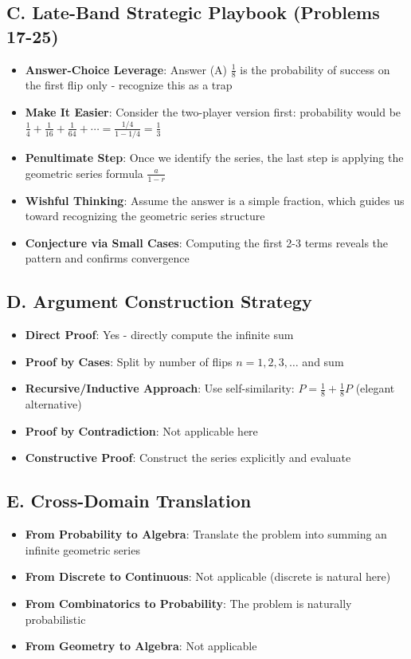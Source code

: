 \documentclass[11pt]{article}
\begin{document}
\begin{strategicbox}
\subsection*{C. Late-Band Strategic Playbook (Problems 17-25)}
\begin{itemize}[leftmargin=*]
    \item \textbf{Answer-Choice Leverage}: Answer (A) $\frac{1}{8}$ is the probability of success on the first flip only - recognize this as a trap
    \item \textbf{Make It Easier}: Consider the two-player version first: probability would be $\frac{1}{4} + \frac{1}{16} + \frac{1}{64} + \cdots = \frac{1/4}{1-1/4} = \frac{1}{3}$
    \item \textbf{Penultimate Step}: Once we identify the series, the last step is applying the geometric series formula $\frac{a}{1-r}$
    \item \textbf{Wishful Thinking}: Assume the answer is a simple fraction, which guides us toward recognizing the geometric series structure
    \item \textbf{Conjecture via Small Cases}: Computing the first 2-3 terms reveals the pattern and confirms convergence
\end{itemize}

\subsection*{D. Argument Construction Strategy}
\begin{itemize}[leftmargin=*]
    \item \textbf{Direct Proof}: Yes - directly compute the infinite sum
    \item \textbf{Proof by Cases}: Split by number of flips $n = 1, 2, 3, \ldots$ and sum
    \item \textbf{Recursive/Inductive Approach}: Use self-similarity: $P = \frac{1}{8} + \frac{1}{8}P$ (elegant alternative)
    \item \textbf{Proof by Contradiction}: Not applicable here
    \item \textbf{Constructive Proof}: Construct the series explicitly and evaluate
\end{itemize}

\subsection*{E. Cross-Domain Translation}
\begin{itemize}[leftmargin=*]
    \item \textbf{From Probability to Algebra}: Translate the problem into summing an infinite geometric series
    \item \textbf{From Discrete to Continuous}: Not applicable (discrete is natural here)
    \item \textbf{From Combinatorics to Probability}: The problem is naturally probabilistic
    \item \textbf{From Geometry to Algebra}: Not applicable
\end{itemize}
\end{strategicbox}
\end{document}
